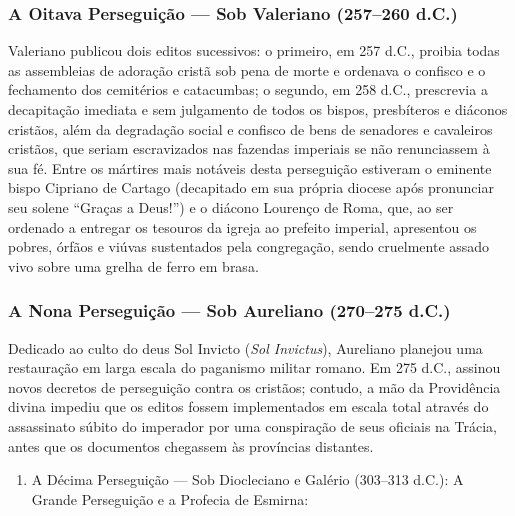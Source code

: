 \documentclass[11pt,a4paper,openany]{book}
\begin{document}
\subsubsection*{A Oitava Perseguição — Sob Valeriano (257–260 d.C.)}
Valeriano publicou dois editos sucessivos: o primeiro, em 257 d.C., proibia todas as assembleias de adoração cristã sob pena de morte e ordenava o confisco e o fechamento dos cemitérios e catacumbas; o segundo, em 258 d.C., prescrevia a decapitação imediata e sem julgamento de todos os bispos, presbíteros e diáconos cristãos, além da degradação social e confisco de bens de senadores e cavaleiros cristãos, que seriam escravizados nas fazendas imperiais se não renunciassem à sua fé. Entre os mártires mais notáveis desta perseguição estiveram o eminente bispo Cipriano de Cartago (decapitado em sua própria diocese após pronunciar seu solene ``Graças a Deus!'') e o diácono Lourenço de Roma, que, ao ser ordenado a entregar os tesouros da igreja ao prefeito imperial, apresentou os pobres, órfãos e viúvas sustentados pela congregação, sendo cruelmente assado vivo sobre uma grelha de ferro em brasa.


\subsubsection*{A Nona Perseguição — Sob Aureliano (270–275 d.C.)}
Dedicado ao culto do deus Sol Invicto (\textit{Sol Invictus}), Aureliano planejou uma restauração em larga escala do paganismo militar romano. Em 275 d.C., assinou novos decretos de perseguição contra os cristãos; contudo, a mão da Providência divina impediu que os editos fossem implementados em escala total através do assassinato súbito do imperador por uma conspiração de seus oficiais na Trácia, antes que os documentos chegassem às províncias distantes.

\begin{enumerate}
  \item A Décima Perseguição — Sob Diocleciano e Galério (303–313 d.C.): A Grande Perseguição e a Profecia de Esmirna:
\end{enumerate}
\end{document}
